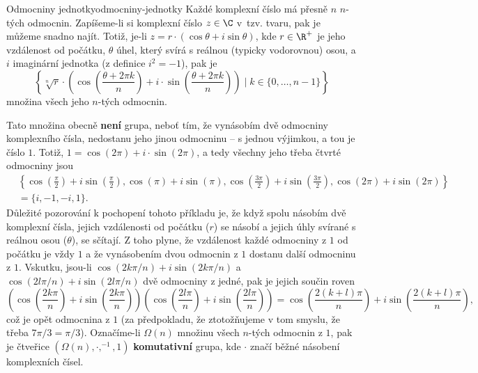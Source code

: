 \begin{example}{Odmocniny jednotky}{odmocniny-jednotky}
 Každé komplexní číslo má přesně $n$ $n$-tých odmocnin. Zapíšeme-li si komplexní
 číslo $z \in \C$ v~tzv.  tvaru, pak je můžeme snadno najít.
 Totiž, je-li $z = r \cdot (\cos\theta + i \sin\theta)$, kde $r \in \R^{+}$ je
 jeho vzdálenost od počátku, $\theta$ úhel, který svírá s reálnou (typicky
 vodorovnou) osou, a $i$ imaginární jednotka (z definice $i^2=-1$), pak je
 \[
  \left\{\sqrt[n]{r} \cdot \left(\cos\left(\frac{\theta + 2\pi k}{n}\right) + i
  \cdot \sin\left(\frac{\theta + 2\pi k}{n}\right)\right) \mid k \in
  \{0,\ldots,n-1\} \right\}
 \]
 množina všech jeho $n$-tých odmocnin.

 Tato množina obecně \textbf{není} grupa, neboť tím, že vynásobím dvě odmocniny
 komplexního čísla, nedostanu jeho jinou odmocninu -- s jednou výjimkou, a tou
 je číslo $1$. Totiž, $1 = \cos(2\pi) + {i \cdot \sin(2\pi)}$, a tedy všechny
 jeho třeba čtvrté odmocniny jsou
 \begin{align*}
  &\left\{ \cos\left(\frac{\pi}{2}\right)+i \sin \left( \frac{\pi}{2} \right),
  \cos \left( \pi \right) + i \sin \left( \pi \right),
  \cos\left(\frac{3\pi}{2}\right)+i\sin \left( \frac{3\pi}{2} \right), \cos
  \left( 2\pi \right) + i\sin \left( 2\pi \right) \right\}\\
  &= \{i, -1, -i, 1\}.
 \end{align*}
 Důležité pozorování k pochopení tohoto příkladu je, že když spolu násobím dvě
 komplexní čísla, jejich vzdálenosti od počátku ($r$) se násobí a jejich úhly
 svírané s reálnou osou ($\theta$), se sčítají. Z toho plyne, že vzdálenost
 každé odmocniny z $1$ od počátku je vždy $1$ a že vynásobením dvou odmocnin z
 $1$ dostanu další odmocninu z $1$. Vskutku, jsou-li $\cos (2k\pi / n) +
 i\sin(2k\pi / n)$ a $\cos(2l\pi / n) + i\sin(2l\pi / n)$ dvě odmocniny z jedné,
 pak je jejich součin roven
 \[
  \left( \cos \left( \frac{2k\pi}{n} \right) + i\sin \left( \frac{2k\pi}{n}
   \right) \right) \left( \cos \left( \frac{2l\pi}{n} \right) + i\sin \left(
   \frac{2l\pi}{n} \right)\right) = \cos \left( \frac{2(k+l)\pi}{n} \right) +
   i\sin \left( \frac{2(k+l)\pi}{n} \right),
 \]
 což je opět odmocnina z $1$ (za předpokladu, že ztotožňujeme  v tom smyslu, že třeba $7\pi / 3 = \pi / 3$). Označíme-li $\Omega(n)$
 množinu všech $n$-tých odmocnin z $1$, pak je čtveřice $(\Omega(n), \cdot
 ,^{-1},1)$ \textbf{komutativní} grupa, kde $ \cdot $ značí běžné násobení
 komplexních čísel.
 \begin{figure}[H]
  \centering
  \begin{subfigure}[t]{.31\textwidth}
   \centering
\end{subfigure}
\end{figure}
\end{example}
